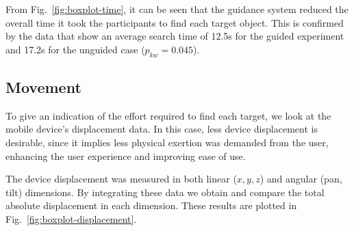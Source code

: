 \documentclass[runningheads]{llncs}
\newcommand\todo[1]{\textcolor{red}{#1}}
\begin{document}

From Fig.~\ref{fig:boxplot-time}, it can be seen that the guidance system reduced the overall time it took the participants to find each target object.
This is confirmed by the data that show an average search time of 12.5s for the guided experiment and 17.2s for the unguided case ($p_{kw}=0.045$).

\subsection{Movement}

To give an indication of the effort required to find each target, we look at the mobile device's displacement data. 
In this case, less device displacement is desirable, since it implies less physical exertion was demanded from the user, enhancing the user experience and improving ease of use.

The device displacement was measured in both linear ($x, y, z$) and angular (pan, tilt) dimensions.
By integrating these data we obtain and compare the total absolute displacement in each dimension.
These results are plotted in Fig.~\ref{fig:boxplot-displacement}.


\end{document}
